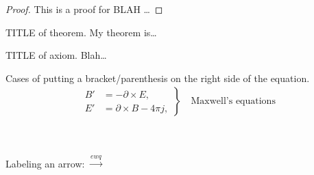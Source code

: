 \begin{proof}
This is a proof for BLAH \dots
\end{proof}




\begin{theorem}{TITLE of theorem.}
My theorem is\dots
\end{theorem}



\begin{axiom}{TITLE of axiom.}
Blah\dots
\end{axiom}



Cases of putting a bracket/parenthesis on the right side of the equation.
\begin{gather*}
	\left.\begin{aligned}
	B'&=-\partial \times E,\\
	E'&=\partial \times B - 4\pi j,
	\end{aligned}
	\right\}
	\quad\text{Maxwell's equations}
\end{gather*}


\ \\
\ \\

Labeling an arrow: $\xrightarrow{ewq}$
